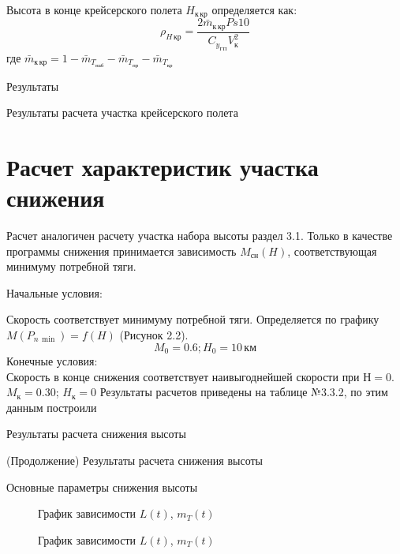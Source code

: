 Высота в конце крейсерского полета $H_{к\, кр}$ определяется как:
\begin{equation}
    \rho_{H\, {кр}} = \frac{2 \bar{m}_{к\, кр} Ps 10 }{C_{y_{ГП}} V_к^2}
\end{equation}
где $\bar{m}_{к\, кр} = 1 - \bar{m}_{T_{наб}} - \bar{m}_{T_{пр}} - \bar{m}_{T_{кр}}$

Результаты

\begin{table}[htpb]
    \centering
    \caption{Результаты расчета участка крейсерского полета}
    \label{tab:kr_flight}
    
\end{table}




\section{Расчет характеристик участка снижения}
Расчет аналогичен расчету участка набора высоты раздел 3.1.
Только в качестве программы снижения принимается зависимость $M_{сн}(H)$,
соответствующая минимуму потребной тяги.

Начальные условия:

Скорость соответствует минимуму потребной тяги. Определяется по графику
$M(P_{n\, \min})=f(H)$ (Рисунок 2.2).
\[
    M_0=0.6; H_0 = 10\, \text{км}
\]
Конечные условия:\\
Скорость в конце снижения соответствует наивыгоднейшей скорости при $Н=0$.
$M_к = 0.30$; $H_к = 0$
Результаты расчетов приведены на таблице №3.3.2, по этим данным построили

\begin{sidewaystable}[ph!]
    \centering
    \caption{Результаты расчета снижения высоты}
    \label{tab:result_descent}
    
    \centering
    \caption{(Продолжение) Результаты расчета снижения высоты}
    \label{tab:result_descent_2}
    
    \caption{Основные параметры снижения высоты}
    
    \label{tab:minitable_descent}
\end{sidewaystable}
\newpage

\begin{figure}[H]
\centering
\resizebox{.79\linewidth}{!}{}
\caption{График зависимости $L(t)$, $m_{T}(t)$}
\label{fig:param_des}
\end{figure}

\begin{figure}[H]
\centering
\resizebox{.79\linewidth}{!}{}
\caption{График зависимости $L(t)$, $m_{T}(t)$}
\label{fig:L_t_des}
\end{figure}
 
